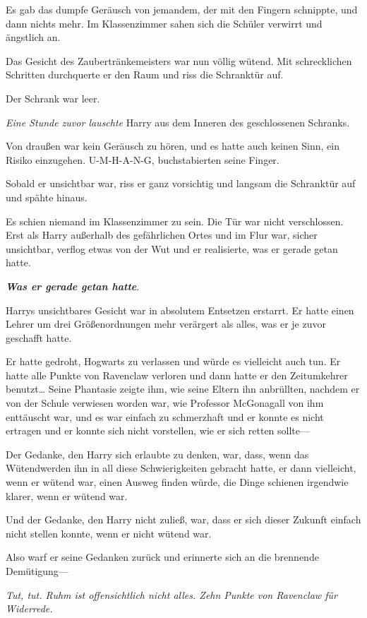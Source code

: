 {Es gab das dumpfe Geräusch von jemandem, der mit den Fingern schnippte, und dann nichts mehr. Im Klassenzimmer sahen sich die Schüler verwirrt und ängstlich an.

Das Gesicht des Zaubertränkemeisters war nun völlig wütend. Mit schrecklichen Schritten durchquerte er den Raum und riss die Schranktür auf.

Der Schrank war leer.

\emph{Eine Stunde zuvor lauschte} Harry aus dem Inneren des geschlossenen Schranks.

Von draußen war kein Geräusch zu hören, und es hatte auch keinen Sinn, ein Risiko einzugehen. U-M-H-A-N-G, buchstabierten seine Finger.

Sobald er unsichtbar war, riss er ganz vorsichtig und langsam die Schranktür auf und spähte hinaus.

Es schien niemand im Klassenzimmer zu sein. Die Tür war nicht verschlossen. Erst als Harry außerhalb des gefährlichen Ortes und im Flur war, sicher unsichtbar, verflog etwas von der Wut und er realisierte, was er gerade getan hatte.

\textbf{\emph{Was er gerade getan hatte}}.

Harrys unsichtbares Gesicht war in absolutem Entsetzen erstarrt. Er hatte einen Lehrer um drei Größenordnungen mehr verärgert als alles, was er je zuvor geschafft hatte.

Er hatte gedroht, Hogwarts zu verlassen und würde es vielleicht auch tun. Er hatte alle Punkte von Ravenclaw verloren und dann hatte er den Zeitumkehrer benutzt… Seine Phantasie zeigte ihm, wie seine Eltern ihn anbrüllten, nachdem er von der Schule verwiesen worden war, wie Professor McGonagall von ihm enttäuscht war, und es war einfach zu schmerzhaft und er konnte es nicht ertragen und er konnte sich nicht vorstellen, wie er sich retten sollte—

Der Gedanke, den Harry sich erlaubte zu denken, war, dass, wenn das Wütendwerden ihn in all diese Schwierigkeiten gebracht hatte, er dann vielleicht, wenn er wütend war, einen Ausweg finden würde, die Dinge schienen irgendwie klarer, wenn er wütend war.

Und der Gedanke, den Harry nicht zuließ, war, dass er sich dieser Zukunft einfach nicht stellen konnte, wenn er nicht wütend war.

Also warf er seine Gedanken zurück und erinnerte sich an die brennende Demütigung—

\emph{Tut, tut. Ruhm ist offensichtlich nicht alles. Zehn Punkte von Ravenclaw für Widerrede.}

}

